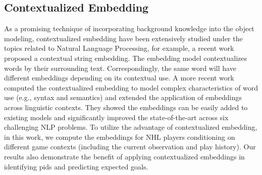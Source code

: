 \documentclass[letterpaper]{article} %
\newcommand{\latentvariables}{\mathbf{z}}
\newcommand{\hiddenstate}{\mathbf{h}}
\newcommand{\state}{\mathbf{s}}
\newcommand{\action}{\mathbf{a}}
\newcommand{\player}{pl}
\begin{document}
\subsection{Contextualized Embedding}
As a promising technique of incorporating background knowledge into the object modeling, contextualized embedding have been extensively studied under the topics related to Natural Language Processing, for example, a recent work~\cite{AkbikBV18} proposed a contextual string embedding. The embedding model contextualizes words by their surrounding text. Correspondingly, the same word will have different embeddings depending on its contextual use. A more recent work~\cite{PetersNIGCLZ18} computed the contextualized embedding to model complex characteristics of word use (e.g., syntax and semantics) and extended the application of embeddings across linguistic contexts. They showed the embeddings can be easily added to existing models and significantly improved the state-of-the-art across six challenging NLP problems. To utilize the advantage of contextualized embedding, in this work, we compute the embeddings for NHL players conditioning on different game contexts (including the current observation and play history). Our results also demonstrate the benefit of applying contextualized embeddings in identifying pids and predicting expected goals. 





\end{document}
